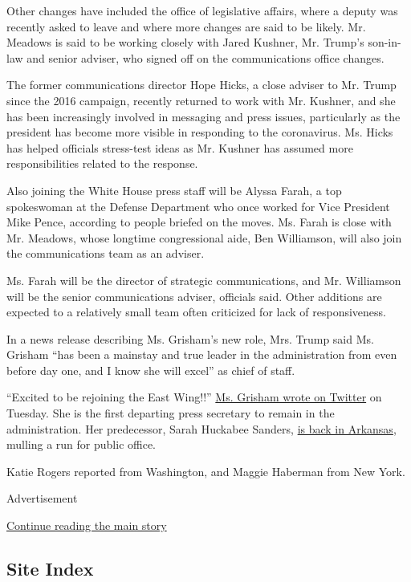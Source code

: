 Other changes have included the office of legislative affairs, where a
deputy was recently asked to leave and where more changes are said to be
likely. Mr. Meadows is said to be working closely with Jared Kushner,
Mr. Trump's son-in-law and senior adviser, who signed off on the
communications office changes.

The former communications director Hope Hicks, a close adviser to Mr.
Trump since the 2016 campaign, recently returned to work with Mr.
Kushner, and she has been increasingly involved in messaging and press
issues, particularly as the president has become more visible in
responding to the coronavirus. Ms. Hicks has helped officials
stress-test ideas as Mr. Kushner has assumed more responsibilities
related to the response.

Also joining the White House press staff will be Alyssa Farah, a top
spokeswoman at the Defense Department who once worked for Vice President
Mike Pence, according to people briefed on the moves. Ms. Farah is close
with Mr. Meadows, whose longtime congressional aide, Ben Williamson,
will also join the communications team as an adviser.

Ms. Farah will be the director of strategic communications, and Mr.
Williamson will be the senior communications adviser, officials said.
Other additions are expected to a relatively small team often criticized
for lack of responsiveness.

In a news release describing Ms. Grisham's new role, Mrs. Trump said Ms.
Grisham ``has been a mainstay and true leader in the administration from
even before day one, and I know she will excel'' as chief of staff.

``Excited to be rejoining the East Wing!!''
\href{https://twitter.com/PressSec/status/1247573744484257794}{Ms.
Grisham wrote on Twitter} on Tuesday. She is the first departing press
secretary to remain in the administration. Her predecessor, Sarah
Huckabee Sanders,
\href{https://www.nytimes.com/2019/11/24/us/politics/sarah-sanders-arkansas-governor.html}{is
back in Arkansas}, mulling a run for public office.

Katie Rogers reported from Washington, and Maggie Haberman from New
York.

Advertisement

\protect\hyperlink{after-bottom}{Continue reading the main story}

\hypertarget{site-index}{%
\subsection{Site Index}\label{site-index}}

